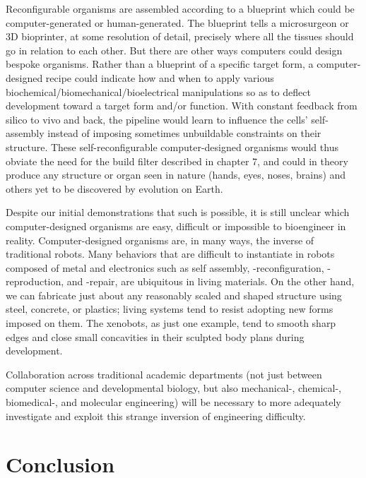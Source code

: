 Reconfigurable organisms are assembled according to a blueprint which could be computer-generated or human-generated.
The blueprint tells a microsurgeon or 3D bioprinter, at some resolution of detail, precisely where all the tissues should go in relation to each other.
But there are other ways computers could design bespoke organisms.
Rather than a blueprint of a specific target form, 
a computer-designed recipe could indicate how and when to apply various biochemical/biomechanical/bioelectrical manipulations so as to deflect development toward a target form and/or function.
With constant feedback from silico to vivo and back,
the pipeline would learn to influence the cells' self-assembly instead of imposing sometimes unbuildable constraints on their structure.
These 
self-reconfigurable computer-designed organisms would thus obviate the need for the build filter described in chapter 7, and could in theory produce any structure or organ seen in nature (hands, eyes, noses, brains) and others yet to be discovered by evolution on Earth.


Despite our initial demonstrations that such is possible, 
it is still unclear which computer-designed organisms are easy, difficult or impossible to bioengineer in reality.
Computer-designed organisms are, in many ways, the inverse of traditional robots.
Many behaviors that are difficult to instantiate in robots composed of metal and electronics such as self assembly, -reconfiguration, -reproduction, and -repair, are ubiquitous in living materials.
On the other hand, we can fabricate just about any reasonably scaled and shaped structure using steel, concrete, or plastics; living systems tend to resist adopting new forms imposed on them.
The xenobots, as just one example, tend to smooth sharp edges and close small concavities in their sculpted body plans during development.

Collaboration across traditional academic departments
(not just between computer science and developmental biology, but also mechanical-, chemical-, biomedical-, and molecular engineering)
will be necessary
to more adequately investigate and exploit this strange inversion of engineering difficulty.




\section{Conclusion}

